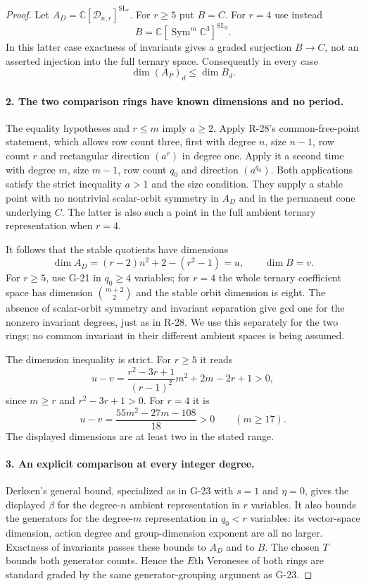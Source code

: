\begin{proof}
Let $A_D=\mathbb C[\mathcal D_{n,r}]^{\mathrm{SL}_r}$.
For $r\ge5$ put $B=C$. For $r=4$ use instead
\[
 B=\mathbb C[\operatorname{Sym}^m\mathbb C^3]^{\mathrm{SL}_3}.
\]
In this latter case exactness of invariants gives a graded
surjection $B\to C$, not an asserted injection into the
full ternary space. Consequently in every case
\begin{equation}\label{G24:hilbertupper}
 \dim(A_P)_d\le\dim B_d.
\end{equation}

\paragraph{2. The two comparison rings have known dimensions and no period.}
The equality hypotheses and $r\le m$ imply $a\ge2$.
Apply R-28's common-free-point statement, which allows
row count three, first with degree $n$, size $n-1$, row
count $r$ and rectangular direction $(a^r)$ in degree one.
Apply it a second time with degree $m$, size $m-1$, row
count $q_0$ and direction $(a^{q_0})$.
Both applications satisfy the strict inequality $a>1$ and
the size condition. They supply a stable point with no
nontrivial scalar-orbit symmetry in $A_D$ and in the
permanent cone underlying $C$. The latter is also such a
point in the full ambient ternary representation when
$r=4$.

It follows that the stable quotients have dimensions
\[
 \dim A_D=(r-2)n^2+2-(r^2-1)=u,
 \qquad \dim B=v.
\]
For $r\ge5$, use G-21 in $q_0\ge4$ variables; for $r=4$
the whole ternary coefficient space has dimension
$\binom{m+2}{2}$ and the stable orbit dimension is eight.
The absence of scalar-orbit symmetry and invariant
separation give gcd one for the nonzero invariant degrees,
just as in R-28. We use this separately for the two rings;
no common invariant in their different ambient spaces is
being assumed.

The dimension inequality is strict. For $r\ge5$ it reads
\[
 u-v=\frac{r^2-3r+1}{(r-1)^2}m^2+2m-2r+1>0,
\]
since $m\ge r$ and $r^2-3r+1>0$.
For $r=4$ it is
\[
 u-v=\frac{55m^2-27m-108}{18}>0\qquad(m\ge17).
\]
The displayed dimensions are at least two in the stated range.

\paragraph{3. An explicit comparison at every integer degree.}
Derksen's general bound, specialized as in G-23 with $s=1$
and $\eta=0$, gives the displayed $\beta$ for the degree-$n$
ambient representation in $r$ variables. It also bounds the
generators for the degree-$m$ representation in $q_0<r$
variables: its vector-space dimension, action degree and
group-dimension exponent are all no larger. Exactness of
invariants passes these bounds to $A_D$ and to $B$.
The chosen $T$ bounds both generator counts. Hence the
$E$th Veroneses of both rings are standard graded by the
same generator-grouping argument as G-23.


\end{proof}
